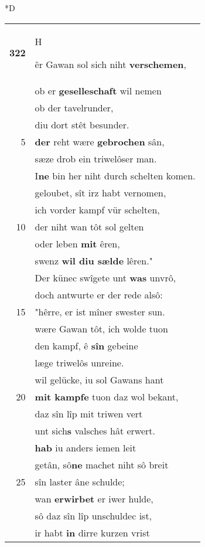 \documentclass[8pt,a4paper,notitlepage]{article}
\begin{document}
\begin{table}[ht]
\begin{minipage}[t]{0.5\linewidth}
\small
\begin{center}*D
\end{center}
\begin{tabular}{rl}
\textbf{322} & \begin{large}H\end{large}êr Gawan sol sich niht \textbf{verschemen},\\ 
 & ob er \textbf{geselleschaft} wil nemen\\ 
 & ob der tavelrunder,\\ 
 & diu dort stêt besunder.\\ 
5 & \textbf{der} reht wære \textbf{gebrochen} sân,\\ 
 & sæze drob ein triwelôser man.\\ 
 & I\textbf{ne} bin her niht durch schelten komen.\\ 
 & geloubet, sît irz habt vernomen,\\ 
 & ich vorder kampf vür schelten,\\ 
10 & der niht wan tôt sol gelten\\ 
 & oder leben \textbf{mit} êren,\\ 
 & swenz \textbf{wil diu sælde} lêren."\\ 
 & Der künec swîgete unt \textbf{was} unvrô,\\ 
 & doch antwurte er der rede alsô:\\ 
15 & "hêrre, er ist mîner swester sun.\\ 
 & wære Gawan tôt, ich wolde tuon\\ 
 & den kampf, ê \textbf{sîn} gebeine\\ 
 & læge triwelôs unreine.\\ 
 & wil gelücke, iu sol Gawans hant\\ 
20 & \textbf{mit kampfe} tuon daz wol bekant,\\ 
 & daz sîn lîp mit triwen vert\\ 
 & unt sich\textbf{s} valsches hât erwert.\\ 
 & \textbf{hab} iu anders iemen leit\\ 
 & getân, sô\textbf{ne} machet niht sô breit\\ 
25 & sîn laster âne schulde;\\ 
 & wan \textbf{erwirbet} er iwer hulde,\\ 
 & sô daz sîn lîp unschuldec ist,\\ 
 & ir habt \textbf{in} dirre kurzen vrist\\ 

\end{tabular}
\end{minipage}
\end{table}
\end{document}
